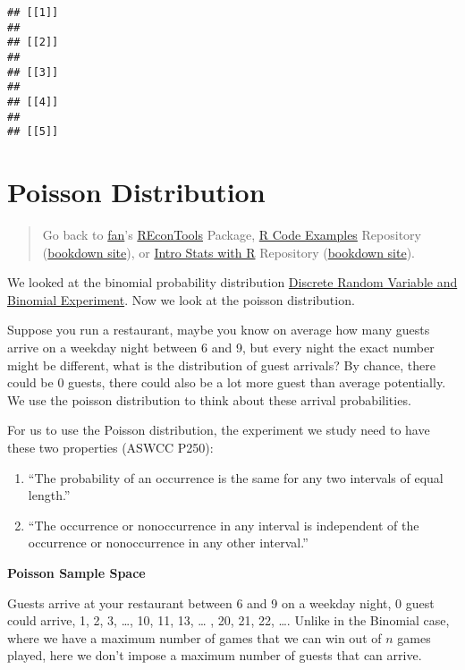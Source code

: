 \documentclass[
]{book}
\providecommand{\tightlist}{%
  \setlength{\itemsep}{0pt}\setlength{\parskip}{0pt}}
\begin{document}
\begin{verbatim}
## [[1]]
## 
## [[2]]
## 
## [[3]]
## 
## [[4]]
## 
## [[5]]
\end{verbatim}

\hypertarget{poisson-distribution}{%
\section{Poisson Distribution}\label{poisson-distribution}}

\begin{quote}
Go back to \href{http://fanwangecon.github.io/}{fan}'s \href{https://fanwangecon.github.io/REconTools/}{REconTools} Package, \href{https://fanwangecon.github.io/R4Econ/}{R Code Examples} Repository (\href{https://fanwangecon.github.io/R4Econ/bookdown}{bookdown site}), or \href{https://fanwangecon.github.io/Stat4Econ/}{Intro Stats with R} Repository (\href{https://fanwangecon.github.io/Stat4Econ/bookdown}{bookdown site}).
\end{quote}

We looked at the binomial probability distribution \href{https://fanwangecon.github.io/Stat4Econ/probability/htmlpdfr/binomial.html}{Discrete Random Variable and Binomial Experiment}. Now we look at the poisson distribution.

Suppose you run a restaurant, maybe you know on average how many guests arrive on a weekday night between 6 and 9, but every night the exact number might be different, what is the distribution of guest arrivals? By chance, there could be \(0\) guests, there could also be a lot more guest than average potentially. We use the poisson distribution to think about these arrival probabilities.

For us to use the Poisson distribution, the experiment we study need to have these two properties (ASWCC P250):

\begin{enumerate}
\def\labelenumi{\arabic{enumi}.}
\tightlist
\item
  ``The probability of an occurrence is the same for any two intervals of equal length.''
\item
  ``The occurrence or nonoccurrence in any interval is independent of the occurrence or nonoccurrence in any other interval.''
\end{enumerate}

\textbf{Poisson Sample Space}

Guests arrive at your restaurant between 6 and 9 on a weekday night, 0 guest could arrive, 1, 2, 3, \ldots, 10, 11, 13, \ldots{} , 20, 21, 22, \ldots. Unlike in the Binomial case, where we have a maximum number of games that we can win out of \(n\) games played, here we don't impose a maximum number of guests that can arrive.
\end{document}
